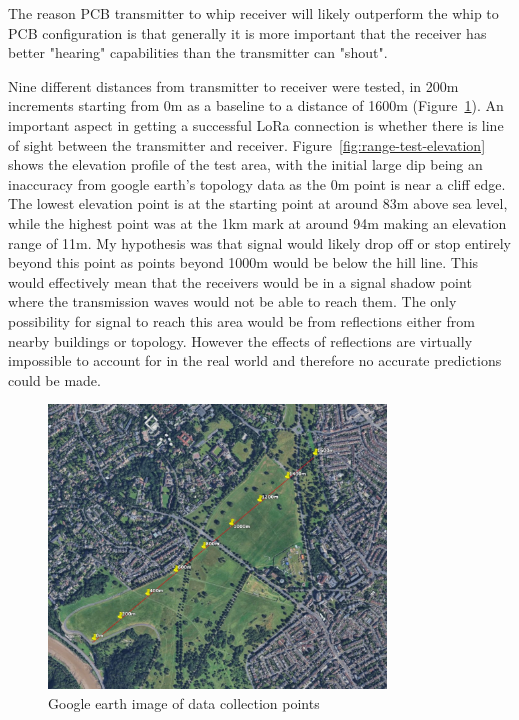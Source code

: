 The reason PCB transmitter to whip receiver will likely outperform the whip to
PCB configuration is that generally it is more important that the receiver has
better "hearing" capabilities than the transmitter can "shout".

Nine different distances from transmitter to receiver were tested, in 200m
increments starting from 0m as a baseline to a distance of 1600m
(Figure~\ref{fig:range-test-markers}). An important aspect in getting a
successful LoRa connection is whether there is line of sight between the
transmitter and receiver. Figure~\ref{fig:range-test-elevation} shows the
elevation profile of the test area, with the initial large dip being an
inaccuracy from google earth's topology data as the 0m point is near a cliff
edge. The lowest elevation point is at the starting point at around 83m above
sea level, while the highest point was at the 1km mark at around 94m making an
elevation range of 11m. My hypothesis was that signal would likely drop off or
stop entirely beyond this point as points beyond 1000m would be below the hill
line. This would effectively mean that the receivers would be in a signal shadow
point where the transmission waves would not be able to reach them. The only
possibility for signal to reach this area would be from reflections either from
nearby buildings or topology. However the effects of reflections are virtually
impossible to account for in the real world and therefore no accurate
predictions could be made.

\begin{figure}[H]
    \centering
    \includegraphics[width=0.8\textwidth]{contents/23-hw-development/23-fig/range-test-markers.jpg}
    \caption{Google earth image of data collection points}
    \label{fig:range-test-markers}
\end{figure}


